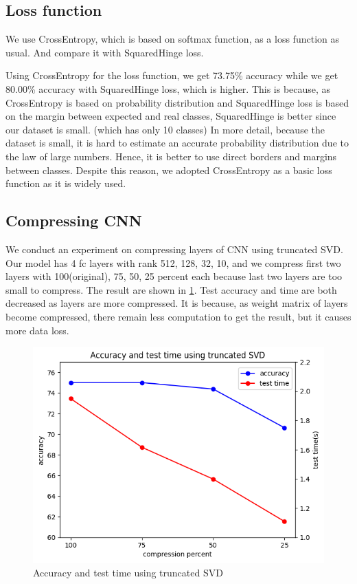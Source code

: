 \subsection{Loss function}
We use CrossEntropy, which is based on softmax function, as a loss function as usual. And compare it with SquaredHinge loss.

Using CrossEntropy for the loss function, we get 73.75\% accuracy while we get 80.00\% accuracy with SquaredHinge loss, which is higher. This is because, as CrossEntropy is based on probability distribution and SquaredHinge loss is based on the margin between expected and real classes, SquaredHinge is better since our dataset is small. (which has only 10 classes) In more detail, because the dataset is small, it is hard to estimate an accurate probability distribution due to the law of large numbers. Hence, it is better to use direct borders and margins between classes. Despite this reason, we adopted CrossEntropy as a basic loss function as it is widely used.

\subsection{Compressing CNN}
We conduct an experiment on compressing layers of CNN using truncated SVD. Our model has 4 fc layers with rank 512, 128, 32, 10, and we compress first two layers with 100(original), 75, 50, 25 percent each because last two layers are too small to compress. The result are shown in \cref{fig:cnn_svd}. Test accuracy and time are both decreased as layers are more compressed. It is because, as weight matrix of layers become compressed, there remain less computation to get the result, but it causes more data loss.

\begin{figure}[htbp]
	\centering
	\includegraphics[width=0.5\linewidth]{image/q4-6-svd.png}
	\caption{Accuracy and test time using truncated SVD}
	\label{fig:cnn_svd}
\end{figure}

